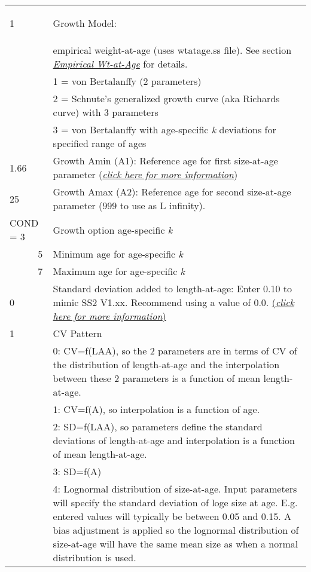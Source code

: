 \begin{center}
\begin{longtable}{p{0.5cm} p{2cm} p{12cm}}
	   \hypertarget{WAAparm}{}
	   1 & & Growth Model: \\
	     & & empirical weight-at-age (uses wtatage.ss file).  See section \hyperlink{WAA}{\textit{Empirical Wt-at-Age}} for details.\\
	     & & 1 = von Bertalanffy (2 parameters)\\
	     & & 2 = Schnute's generalized growth curve (aka Richards curve) with 3 parameters \\
	     & & 3 = von Bertalanffy with age-specific \textit{k} deviations for specified range of ages\\
	   \hline

	   1.66 & & Growth Amin (A1): Reference age for first size-at-age parameter (\hyperlink{A1}{\textit{click here for more information}})\\
	   \hline

	   25 & & Growth Amax (A2): Reference age for second size-at-age parameter (999 to use as L infinity).\\
	   \hline

	   \multicolumn{2}{l}{COND = 3} & Growth option age-specific \textit{k}\\
	   & 5 & Minimum age for age-specific \textit{k}\\
	   & 7 & Maximum age for age-specific \textit{k}\\
	   \hline

	   0 & & Standard deviation added to length-at-age: Enter 0.10 to mimic SS2 V1.xx. Recommend using a value of 0.0.  \hyperlink{A1}{(\textit{click here for more information})}\\
	   \hline
	   1 & & CV Pattern \\
	     & & 0: CV=f(LAA), so the 2 parameters are in terms of CV of the distribution of length-at-age and the interpolation between these 2 parameters is a function of mean length-at-age.\\
	     & & 1: CV=f(A), so interpolation is a function of age.\\
	   \hline
	     & & 2: SD=f(LAA), so parameters define the standard deviations of length-at-age and interpolation is a function of mean length-at-age.\\
	     & & 3: SD=f(A) \\
	     & & 4: Lognormal distribution of size-at-age.  Input parameters will specify the standard deviation of loge size at age.  E.g. entered values will typically be between 0.05 and 0.15.  A bias adjustment is applied so the lognormal distribution of size-at-age will have the same mean size as when a normal distribution is used.\\
	   \hline


\end{longtable}
\end{center}
